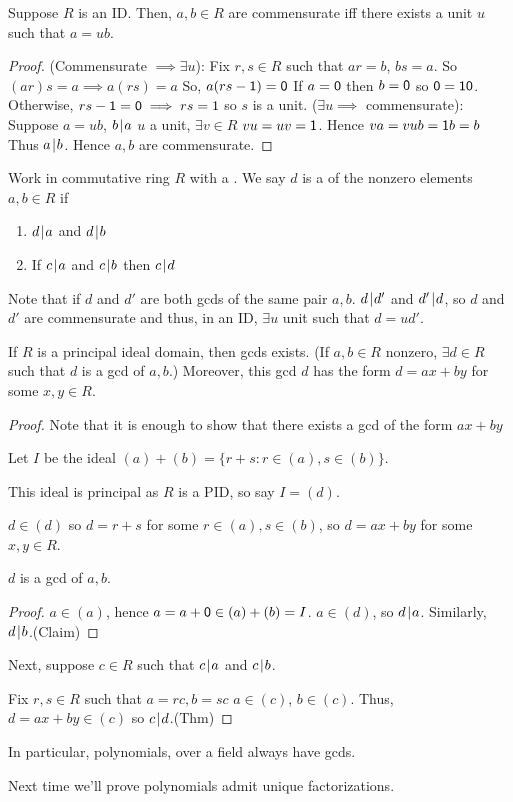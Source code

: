 \documentclass[notes.tex]{subfiles}
\begin{document}
\begin{proposition}
	Suppose $R$ is an ID.
	Then, $a,b\in R$ are commensurate iff there exists a unit $u$ such that $a=ub$.
\end{proposition}
\begin{proof}
	(Commensurate $\implies \exists u$):
	\tabin
		Fix $r, s\in R$ such that $ar = b$, $bs = a$.
		So $(ar)s = a \implies a(rs) = a$ So, $a(rs-\mathsf{1}) = \mathsf{0}$
		If $a = \mathsf{0}$ then $b= \mathsf{0}$ so $\mathsf{0}=\mathsf{1}\mathsf{0}$.
		Otherwise, $rs - \mathsf{1} = \mathsf{0} \implies rs = 1$ so $s$ is a unit.
	\tabout
	($\exists u \implies$ commensurate):
	\tabin
		Suppose $a=ub$, $b\mkern2mu|\mkern1mu a$ $u$ a unit, $\exists v\in R$ $vu = uv = \mathsf{1}$. Hence $va = vub = \mathsf{1} b = b$ Thus $a\mkern2mu|\mkern1mu b$. Hence $a, b$ are commensurate.
	\tabout
\end{proof}

\begin{defn}
	Work in commutative ring $R$ with a \one. We say $d$ is a  of the nonzero elements $a,b\in R$ 
	if 
	\begin{enumerate}
		\item $d\mkern2mu|\mkern1mu a$ and $d\mkern2mu|\mkern1mu b$
		\item If $c\mkern2mu|\mkern1mu a$ and $c\mkern2mu|\mkern1mu b$ then $c\mkern2mu|\mkern1mu d$
	\end{enumerate}
\end{defn}

Note that if $d$ and $d'$ are both gcds of the same pair $a,b$. $d\mkern2mu|\mkern1mu d'$ and $d'\mkern2mu|\mkern1mu d$, so $d$ and $d'$ are commensurate and thus, in an ID, $\exists u$ unit such that $d = ud'$.

\begin{theorem}
	If $R$ is a principal ideal domain, then gcds exists. (If $a,b\in R$ nonzero, $\exists d\in R$ such that $d$ is a gcd of $a, b$.) Moreover, this gcd $d$ has the form $d=ax+by$ for some $x, y\in R$.
\end{theorem}
\begin{proof}
	Note that it is enough to show that there exists a gcd of the form $ax+by$

	Let $I$ be the ideal $(a) + (b) = \{r + s : r\in (a), s\in (b)\}$.

	This ideal is principal as $R$ is a PID, so say $I = (d)$.

	$d\in (d)$ so $d = r + s$ for some $r\in (a), s\in (b)$, so $d = ax+by$ for some $x,y\in R$. 

	\begin{claim}
		$d$ is a gcd of $a, b$.
	\end{claim}
	\begin{proof}
		$a\in (a)$, hence $a = a + \mathsf{0}\in (a) + (b) = I$.
		$a\in (d)$, so $d\mkern2mu|\mkern1mu a$.
		Similarly, $d\mkern2mu|\mkern1mu b$.\qedhere(Claim)
	\end{proof}

	Next, suppose $c\in R$ such that $c\mkern2mu|\mkern1mu a$ and $c\mkern2mu|\mkern1mu b$.


	Fix $r,s\in R$ such that $a=rc, b=sc$ $a\in (c)$, $b\in (c)$. Thus, $d = ax + by \in (c)$ so $c\mkern2mu|\mkern1mu d$.\qedhere(Thm)
\end{proof}

In particular, polynomials, over a field always have gcds.

Next time we'll prove polynomials admit unique factorizations.
\end{document}
